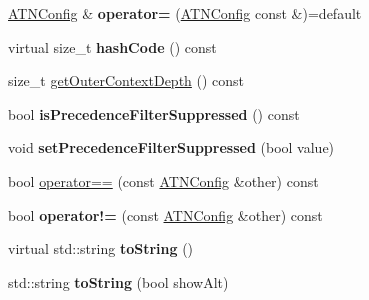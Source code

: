 \begin{DoxyCompactItemize}
\item 
\mbox{\label{classantlr4_1_1atn_1_1ATNConfig_adb35bccb780fcbf21bbc7f444b0d57db}} 
\hyperlink{classantlr4_1_1atn_1_1ATNConfig}{A\+T\+N\+Config} \& {\bfseries operator=} (\hyperlink{classantlr4_1_1atn_1_1ATNConfig}{A\+T\+N\+Config} const \&)=default
\item 
\mbox{\label{classantlr4_1_1atn_1_1ATNConfig_a54366241b4eab72f182ce26e6b9d55fb}} 
virtual size\+\_\+t {\bfseries hash\+Code} () const
\item 
size\+\_\+t \hyperlink{classantlr4_1_1atn_1_1ATNConfig_ad06261312a72cfeb52a351a77c7bbb86}{get\+Outer\+Context\+Depth} () const
\item 
\mbox{\label{classantlr4_1_1atn_1_1ATNConfig_a2cd2c3806345787f3d3af9b4ca11ee93}} 
bool {\bfseries is\+Precedence\+Filter\+Suppressed} () const
\item 
\mbox{\label{classantlr4_1_1atn_1_1ATNConfig_a28317105ace986bdf348e0cdbade81e9}} 
void {\bfseries set\+Precedence\+Filter\+Suppressed} (bool value)
\item 
bool \hyperlink{classantlr4_1_1atn_1_1ATNConfig_a3ec70b1cc06793d2b9d5aab1e662909b}{operator==} (const \hyperlink{classantlr4_1_1atn_1_1ATNConfig}{A\+T\+N\+Config} \&other) const
\item 
\mbox{\label{classantlr4_1_1atn_1_1ATNConfig_afa411b4b9765a9040f0ccbf2b7d7dbce}} 
bool {\bfseries operator!=} (const \hyperlink{classantlr4_1_1atn_1_1ATNConfig}{A\+T\+N\+Config} \&other) const
\item 
\mbox{\label{classantlr4_1_1atn_1_1ATNConfig_afd8ea6c2122f79c898968f6dbae6697f}} 
virtual std\+::string {\bfseries to\+String} ()
\item 
\mbox{\label{classantlr4_1_1atn_1_1ATNConfig_a2358f792cada9677c439169e5cf643a4}} 
std\+::string {\bfseries to\+String} (bool show\+Alt)
\end{DoxyCompactItemize}
